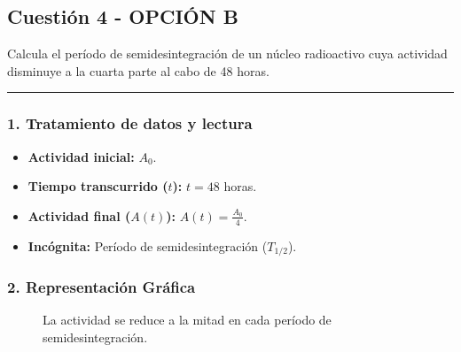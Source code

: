 \newpage

\subsection{Cuestión 4 - OPCIÓN B}
\label{subsec:6B_2005_sep_cv}

\begin{cajaenunciado}
Calcula el período de semidesintegración de un núcleo radioactivo cuya actividad disminuye a la cuarta parte al cabo de 48 horas.
\end{cajaenunciado}
\hrule

\subsubsection*{1. Tratamiento de datos y lectura}
\begin{itemize}
    \item \textbf{Actividad inicial:} $A_0$.
    \item \textbf{Tiempo transcurrido ($t$):} $t = 48$ horas.
    \item \textbf{Actividad final ($A(t)$):} $A(t) = \frac{A_0}{4}$.
    \item \textbf{Incógnita:} Período de semidesintegración ($T_{1/2}$).
\end{itemize}

\subsubsection*{2. Representación Gráfica}
\begin{figure}[H]
    \centering
    \caption{La actividad se reduce a la mitad en cada período de semidesintegración.}
\end{figure}

